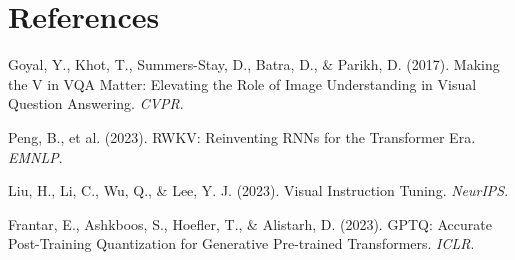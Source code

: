 \documentclass[final]{article}
\begin{document}
\newpage
\section*{References}
Goyal, Y., Khot, T., Summers-Stay, D., Batra, D., \& Parikh, D. (2017). Making the V in VQA
Matter: Elevating the Role of Image Understanding in Visual Question Answering. \emph{CVPR}.

Peng, B., et al. (2023). RWKV: Reinventing RNNs for the Transformer Era. \emph{EMNLP}.

Liu, H., Li, C., Wu, Q., \& Lee, Y. J. (2023). Visual Instruction Tuning. \emph{NeurIPS}.

Frantar, E., Ashkboos, S., Hoefler, T., \& Alistarh, D. (2023). GPTQ: Accurate Post-Training
Quantization for Generative Pre-trained Transformers. \emph{ICLR}.
\end{document}
